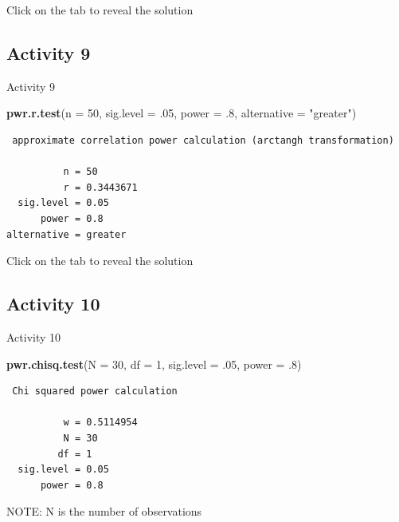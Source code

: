 \documentclass[]{book}
\newenvironment{Shaded}{\begin{snugshade}}{\end{snugshade}}
\newcommand{\DataTypeTok}[1]{\textcolor[rgb]{0.13,0.29,0.53}{#1}}
\newcommand{\DecValTok}[1]{\textcolor[rgb]{0.00,0.00,0.81}{#1}}
\newcommand{\FloatTok}[1]{\textcolor[rgb]{0.00,0.00,0.81}{#1}}
\newcommand{\KeywordTok}[1]{\textcolor[rgb]{0.13,0.29,0.53}{\textbf{#1}}}
\newcommand{\NormalTok}[1]{#1}
\newcommand{\StringTok}[1]{\textcolor[rgb]{0.31,0.60,0.02}{#1}}
\begin{document}
Click on the tab to reveal the solution

\hypertarget{activity-9-2}{%
\subsection{Activity 9}\label{activity-9-2}}

Activity 9

\begin{Shaded}
\begin{Highlighting}[]
\KeywordTok{pwr.r.test}\NormalTok{(}\DataTypeTok{n =} \DecValTok{50}\NormalTok{,}
           \DataTypeTok{sig.level =} \FloatTok{.05}\NormalTok{, }
           \DataTypeTok{power =} \FloatTok{.8}\NormalTok{, }
           \DataTypeTok{alternative =} \StringTok{"greater"}\NormalTok{)}
\end{Highlighting}
\end{Shaded}

\begin{verbatim}
 approximate correlation power calculation (arctangh transformation) 

          n = 50
          r = 0.3443671
  sig.level = 0.05
      power = 0.8
alternative = greater
\end{verbatim}

Click on the tab to reveal the solution

\hypertarget{activity-10}{%
\subsection{Activity 10}\label{activity-10}}

Activity 10

\begin{Shaded}
\begin{Highlighting}[]
\KeywordTok{pwr.chisq.test}\NormalTok{(}\DataTypeTok{N =} \DecValTok{30}\NormalTok{,}
               \DataTypeTok{df =} \DecValTok{1}\NormalTok{,}
           \DataTypeTok{sig.level =} \FloatTok{.05}\NormalTok{, }
           \DataTypeTok{power =} \FloatTok{.8}\NormalTok{)}
\end{Highlighting}
\end{Shaded}

\begin{verbatim}
 Chi squared power calculation 

          w = 0.5114954
          N = 30
         df = 1
  sig.level = 0.05
      power = 0.8
\end{verbatim}

NOTE: N is the number of observations
\end{document}
